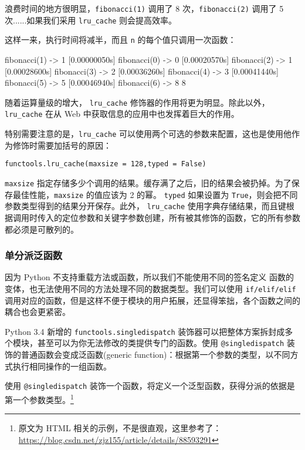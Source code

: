 浪费时间的地方很明显，\texttt{fibonacci(1)} 调用了 8 次，\texttt{fibonacci(2)} 调用了 5 次......如果我们采用 \texttt{lru\_cache} 则会提高效率。



这样一来，执行时间将减半，而且 \texttt{n} 的每个值只调用一次函数：

\begin{python}
[0.00000020s] fibonacci(1) -> 1
[0.00000050s] fibonacci(0) -> 0
[0.00020570s] fibonacci(2) -> 1
[0.00028600s] fibonacci(3) -> 2
[0.00036260s] fibonacci(4) -> 3
[0.00041440s] fibonacci(5) -> 5
[0.00046940s] fibonacci(6) -> 8
8
\end{python}

随着运算量级的增大， \texttt{lru\_cache} 修饰器的作用将更为明显。除此以外，\texttt{lru\_cache} 在从 Web 中获取信息的应用中也发挥着巨大的作用。

特别需要注意的是，\texttt{lru\_cache} 可以使用两个可选的参数来配置，这也是使用他作为修饰时需要加括号的原因：

\texttt{functools.lru\_cache(maxsize = 128,typed = False)}

\texttt{maxsize} 指定存储多少个调用的结果。缓存满了之后，旧的结果会被扔掉。为了保存最佳性能，\texttt{maxsize} 的值应该为 2 的幂。 \texttt{typed} 如果设置为 \texttt{True}，则会把不同参数类型得到的结果分开保存。此外， \texttt{lru\_cache} 使用字典存储结果，而且键根据调用时传入的定位参数和关键字参数创建，所有被其修饰的函数，它的所有参数都必须是可散列的。

\subsubsection{单分派泛函数}

因为 Python 不支持重载方法或函数，所以我们不能使用不同的签名定义 函数的变体，也无法使用不同的方法处理不同的数据类型。我们可以使用 \texttt{if/elif/elif} 调用对应的函数，但是这样不便于模块的用户拓展，还显得笨拙，各个函数之间的耦合也会更紧密。

Python 3.4 新增的 \texttt{functools.singledispatch} 装饰器可以把整体方案拆封成多个模块，甚至可以为你无法修改的类提供专门的函数。使用 \texttt{@singledispatch} 装饰的普通函数会变成泛函数(generic function)：根据第一个参数的类型，以不同方式执行相同操作的一组函数。 

使用 \texttt{@singledispatch} 装饰一个函数，将定义一个泛型函数，获得分派的依据是第一个参数类型。\footnote{原文为 HTML 相关的示例，不是很直观，这里参考了：\url{https://blog.csdn.net/zjz155/article/details/88593291}}

